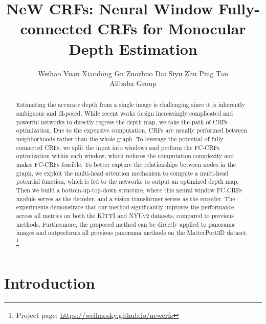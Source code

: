 \documentclass[10pt,twocolumn,letterpaper]{article}
\begin{document}
\title{NeW CRFs: Neural Window Fully-connected CRFs for Monocular Depth Estimation}

\author{
Weihao Yuan\hspace{0.5cm}
Xiaodong Gu\hspace{0.5cm}
Zuozhuo Dai\hspace{0.5cm}
Siyu Zhu\hspace{0.5cm}
Ping Tan\\
Alibaba Group
\vspace{-20mm}
}

\maketitle


\begin{abstract}

Estimating the accurate depth from a single image is challenging since it is inherently ambiguous and ill-posed. While recent works design increasingly complicated and powerful networks to directly regress the depth map, we take the path of CRFs optimization. 
Due to the expensive computation, CRFs are usually performed between neighborhoods rather than the whole graph.
To leverage the potential of fully-connected CRFs, we split the input into windows and perform the FC-CRFs optimization within each window, which reduces the computation complexity and makes FC-CRFs feasible. 
To better capture the relationships between nodes in the graph, we exploit the multi-head attention mechanism to compute a multi-head potential function, which is fed to the networks to output an optimized depth map.
Then we build a bottom-up-top-down structure, where this neural window FC-CRFs module serves as the decoder, and a vision transformer serves as the encoder.
The experiments demonstrate that our method significantly improves the performance across all metrics on both the KITTI and NYUv2 datasets, compared to previous methods.
Furthermore, the proposed method can be directly applied to panorama images and outperforms all previous panorama methods on the MatterPort3D dataset. \footnote{Project page: \url{https://weihaosky.github.io/newcrfs}}


\end{abstract}

%
 






\section{Introduction}
\label{sec:intro}
\end{document}
